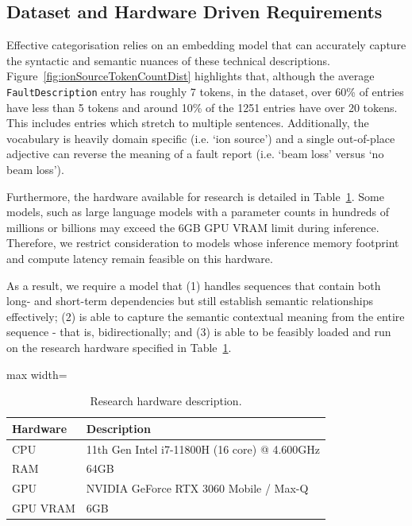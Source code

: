 \documentclass[10pt,oneside]{report}
\begin{document}
\subsection{Dataset and Hardware Driven Requirements}\label{sec:req}
Effective categorisation relies on an embedding model that can accurately capture the syntactic and semantic nuances of these technical descriptions. Figure~\ref{fig:ionSourceTokenCountDist} highlights that, although the average \texttt{FaultDescription} entry has roughly 7 tokens, in the dataset, over 60\% of entries have less than 5 tokens and around 10\% of the 1251 entries have over 20 tokens. This includes entries which stretch to multiple sentences. Additionally, the vocabulary is heavily domain specific (i.e. `ion source') and a single out-of-place adjective can reverse the meaning of a fault report (i.e. `beam loss' versus `no beam loss').  

Furthermore, the hardware available for research is detailed in Table~\ref{tab:researchHw}. Some models, such as large language models with a parameter counts in hundreds of millions or billions may exceed the 6GB GPU VRAM limit during inference. Therefore, we restrict consideration to models whose inference memory footprint and compute latency remain feasible on this hardware.

As a result, we require a model that (1) handles sequences that contain both long- and short-term dependencies but still establish semantic relationships effectively; (2) is able to capture the semantic contextual meaning from the entire sequence - that is, bidirectionally; and (3) is able to be feasibly loaded and run on the research hardware specified in Table~\ref{tab:researchHw}.

\begin{table}[htbp]
    \fontsize{8}{12}\selectfont
    \centering
    \begin{adjustbox}{max width=\textwidth}
        \begin{tabular}{p{3cm}|p{10cm}}
        \toprule
        \textbf{Hardware} & \textbf{Description} \\
        \midrule
        {CPU} & {11th Gen Intel i7-11800H (16 core) @ 4.600GHz} \\
        {RAM} & {64GB} \\
        {GPU} & {NVIDIA GeForce RTX 3060 Mobile / Max-Q} \\
        {GPU VRAM} & {6GB} \\
        \bottomrule
    \end{tabular}
    \end{adjustbox}
    \caption{Research hardware description.}
    \label{tab:researchHw}
\end{table}
\end{document}
